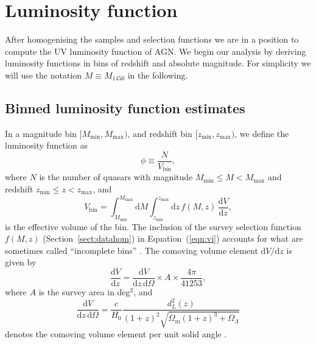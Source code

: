\documentclass[fleqn,usenatbib]{mnras}
\begin{document}
\section{Luminosity function}
\label{sec:lf}

After homogenising the samples and selection functions we are in a position
to compute the UV luminosity function of AGN. We begin our analysis by
deriving luminosity functions in bins of redshift and absolute magnitude.
For simplicity we will use the notation $M\equiv M_{1450}$ in the following.

\subsection{Binned luminosity function estimates}
\label{sec:binnedlf}

In a magnitude bin $[M_\mathrm{min}, M_\mathrm{max})$, and redshift
bin $[z_\mathrm{min}, z_\mathrm{max})$, we define the luminosity
function as \citep{2000MNRAS.311..433P}
\begin{equation}
  \phi \equiv \frac{N}{V_\mathrm{bin}},
\end{equation}
where $N$ is the number of quasars with magnitude
$M_\mathrm{min}\leq M<M_\mathrm{max}$ and redshift
$z_\mathrm{min}\leq z<z_\mathrm{max}$, and
\begin{equation}
  V_\mathrm{bin} = \int_{M_\mathrm{min}}^{M_\mathrm{max}}\mathrm{d}M
  \int_{z_\mathrm{min}}^{z_\mathrm{max}}\mathrm{d}z\, f(M, z)\,\frac{\mathrm{d}V}{\mathrm{d}z},
  \label{eqn:vi}
\end{equation}
is the effective volume of the bin. The inclusion of the survey selection function
$f(M,z)$ (Section~\ref{sect:datahom}) in Equation~(\ref{eqn:vi}) accounts for
what are sometimes called ``incomplete bins''
\citep{2006AJ....131.2766R}.  The comoving volume element $\mathrm{d}V/\mathrm{d}z$ is
given by
\begin{equation}
  \frac{\mathrm{d}V}{\mathrm{d}z}=\frac{\mathrm{d}V}{\mathrm{d}z\,\mathrm{d}\Omega}\times A\times\frac{4\pi}{41253},
\end{equation}
where $A$ is the survey area in deg$^2$, and 
\begin{equation}
  \frac{\mathrm{d}V}{\mathrm{d}z\,\mathrm{d}\Omega}=\frac{c}{H_0}\frac{d_L^2\left(z\right)}
       {\left(1+z\right)^2\sqrt{\Omega_\mathrm{m}\left(1+z\right)^3+\Omega_\Lambda}}
  \label{eqn:dvdzdo}
\end{equation}
denotes the comoving volume element per unit solid angle
\citep{1999astro.ph..5116H}.  
\end{document}
